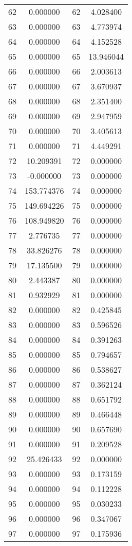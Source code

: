 \documentclass[12pt]{article}
\begin{document}
\begin{longtable}{@{}cccc@{}}
62 & 0.000000 & 62 & 4.028400 \\
63 & 0.000000 & 63 & 4.773974 \\
64 & 0.000000 & 64 & 4.152528 \\
65 & 0.000000 & 65 & 13.946044 \\
66 & 0.000000 & 66 & 2.003613 \\
67 & 0.000000 & 67 & 3.670937 \\
68 & 0.000000 & 68 & 2.351400 \\
69 & 0.000000 & 69 & 2.947959 \\
70 & 0.000000 & 70 & 3.405613 \\
71 & 0.000000 & 71 & 4.449291 \\
72 & 10.209391 & 72 & 0.000000 \\
73 & -0.000000 & 73 & 0.000000 \\
74 & 153.774376 & 74 & 0.000000 \\
75 & 149.694226 & 75 & 0.000000 \\
76 & 108.949820 & 76 & 0.000000 \\
77 & 2.776735 & 77 & 0.000000 \\
78 & 33.826276 & 78 & 0.000000 \\
79 & 17.135500 & 79 & 0.000000 \\
80 & 2.443387 & 80 & 0.000000 \\
81 & 0.932929 & 81 & 0.000000 \\
82 & 0.000000 & 82 & 0.425845 \\
83 & 0.000000 & 83 & 0.596526 \\
84 & 0.000000 & 84 & 0.391263 \\
85 & 0.000000 & 85 & 0.794657 \\
86 & 0.000000 & 86 & 0.538627 \\
87 & 0.000000 & 87 & 0.362124 \\
88 & 0.000000 & 88 & 0.651792 \\
89 & 0.000000 & 89 & 0.466448 \\
90 & 0.000000 & 90 & 0.657690 \\
91 & 0.000000 & 91 & 0.209528 \\
92 & 25.426433 & 92 & 0.000000 \\
93 & 0.000000 & 93 & 0.173159 \\
94 & 0.000000 & 94 & 0.112228 \\
95 & 0.000000 & 95 & 0.030233 \\
96 & 0.000000 & 96 & 0.347067 \\
97 & 0.000000 & 97 & 0.175936 \\

\end{longtable}
\end{document}
